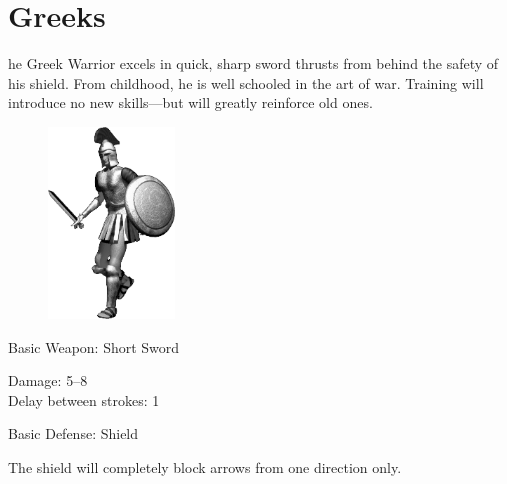 \clearpage

\section{Greeks}


he Greek Warrior excels in quick, sharp sword thrusts from behind the safety of his shield. From childhood, he is well schooled in the art of war. Training will introduce no new skills---but will greatly reinforce old ones.

\begin{figure}
	\begin{center}
		\vspace{-20pt}
		\includegraphics[width=0.3\textwidth]{Agreek}
	\end{center}
	\vspace{-20pt}
\end{figure}

Basic Weapon: Short Sword
\begin{adjustwidth}{1cm}{}
	Damage: 5–8 \\
	Delay between strokes: 1
\end{adjustwidth}
Basic Defense: Shield
\begin{adjustwidth}{1cm}{}
	The shield will completely block arrows from one direction only. \\ \\ \\ \\ \\ \\
\end{adjustwidth}

